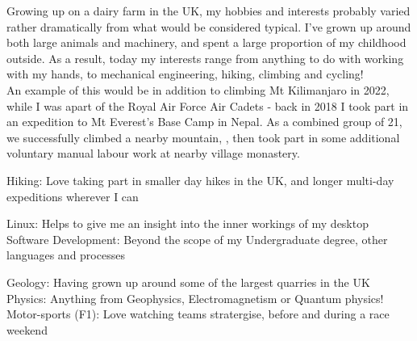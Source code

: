 




\begin{cvparagraph}
Growing up on a dairy farm in the UK, my hobbies and interests probably varied rather dramatically from what would be considered typical. I've grown up around both large animals and machinery, and spent a large proportion of my childhood outside. 
As a result, today my interests range from anything to do with working with my hands, to mechanical engineering, hiking, climbing and cycling! \\

An example of this would be in addition to climbing Mt Kilimanjaro in 2022, while I was apart of the Royal Air Force Air Cadets - back in 2018 I took part in an expedition to Mt Everest's Base Camp in Nepal. As a combined group of 21, we successfully climbed a nearby mountain, \href{https://maps.app.goo.gl/haqDGBrhwZV59Dht8}{\color{darkblue}{Kala Patthar}}, then took part in some additional voluntary manual labour work at nearby village monastery.

\end{cvparagraph}

\begin{cvskills}
  \cvskill
    {Hiking:} %
    {Love taking part in smaller day hikes in the UK, and longer multi-day expeditions wherever I can} %

  \cvskill
    {Linux:} %
    {Helps to give me an insight into the inner workings of my desktop} %
  \cvskill
    {Software Development:} %
    {Beyond the scope of my Undergraduate degree, other languages and processes} %

\cvskill
    {Geology:} %
    {Having grown up around some of the largest quarries in the UK} %
  \cvskill
    {Physics:} %
    {Anything from Geophysics, Electromagnetism or Quantum physics!} %
  \cvskill
    {Motor-sports (F1):} %
    {Love watching teams stratergise, before and during a race weekend} %

\end{cvskills}